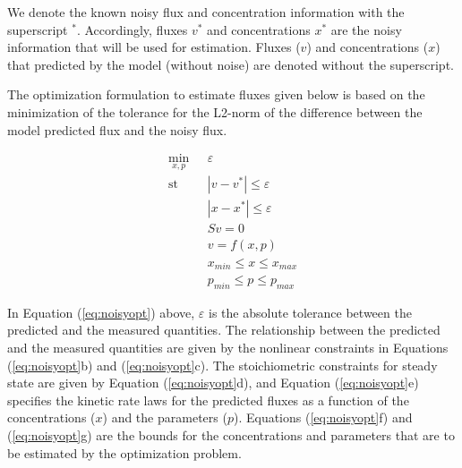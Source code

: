\documentclass[10pt]{report}
\begin{document}
	We denote the known noisy flux and concentration information with the superscript $^*$. Accordingly, fluxes $v^*$ and concentrations $x^*$ are the noisy information that will be used for estimation. Fluxes ($v$) and concentrations ($x$) that predicted by the model (without noise) are denoted without the superscript.
	
	The optimization formulation to estimate fluxes given below is based on the minimization of the tolerance for the L2-norm of the difference between the model predicted flux and the noisy flux. 
	\begin{center}
		\begin{subequations}\label{eq:noisyopt}
			\begin{align}
			\underset{x,p}{\mathrm{min}} & \text{      }\varepsilon\\
			\mathrm{st} & \text{      }|v-v^*| \le \varepsilon\\
			& \text{      }|x-x^*| \le \varepsilon\\
			& \text{      }Sv = 0\\
			& \text{      }v = f(x,p)\\
			& \text{      }x_{min}\le x \le x_{max}\\
			& \text{      }p_{min} \le p \le p_{max}
			\end{align}
		\end{subequations}		
	\end{center}

	In Equation (\ref{eq:noisyopt}) above, $\varepsilon$ is the absolute tolerance between the predicted and the measured quantities. The relationship between the predicted and the measured quantities are given by the nonlinear constraints in Equations (\ref{eq:noisyopt}b) and (\ref{eq:noisyopt}c). The stoichiometric constraints for steady state are given by Equation (\ref{eq:noisyopt}d), and Equation (\ref{eq:noisyopt}e) specifies the kinetic rate laws for the predicted fluxes as a function of the concentrations ($x$) and the parameters ($p$). Equations (\ref{eq:noisyopt}f) and (\ref{eq:noisyopt}g) are the bounds for the concentrations and parameters that are to be estimated by the optimization problem. 

	
	
	
\end{document}
